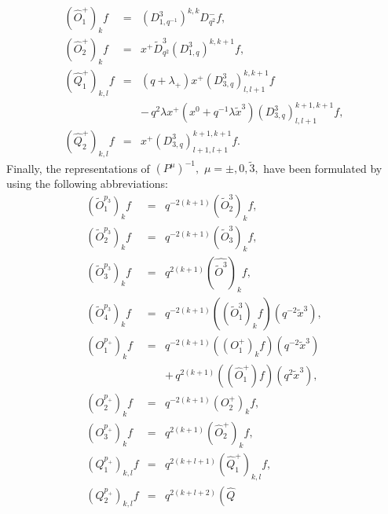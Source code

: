 \documentclass[a4paper,11pt,oneside]{article}
\begin{document}
\begin{enumerate}
\begin{eqnarray}
\\[0.16in]
\left( \hat{O}_{1}^{+}\right) _{k}f &=&\left( D_{1,q^{-1}}^{3}\right)
^{k,k}D_{q^{2}}^{-}f, \\
\left( \hat{O}_{2}^{+}\right) _{k}f &=&x^{+}\tilde{D}_{q^{2}}^{3}\left(
D_{1,q}^{3}\right) ^{k,k+1}f,  \nonumber \\[0.16in]
\left( \hat{Q}_{1}^{+}\right) _{k,l}f &=&\left( q+\lambda _{+}\right)
x^{+}\left( D_{3,q}^{3}\right) _{l,l+1}^{k,k+1}f \\
&&-\,q^{2}\lambda x^{+}\left( x^{0}+q^{-1}\lambda \tilde{x}^{3}\right)
\left( D_{3,q}^{3}\right) _{l,l+1}^{k+1,k+1}f,  \nonumber \\
\left( \hat{Q}_{2}^{+}\right) _{k,l}f &=&x^{+}\left( D_{3,q}^{3}\right)
_{l+1,l+1}^{k+1,k+1}f.  \nonumber
\end{eqnarray}
Finally, the representations of $\left( P^{\mu}\right) ^{-1},$ $\mu=\pm ,0,\tilde{3%
},$ have been formulated by using the following abbreviations: 
\begin{eqnarray}
\left( \tilde{O}_{1}^{p_{3}}\right) _{k}f &=&q^{-2\left( k+1\right) }\left( 
\tilde{O}_{2}^{3}\right) _{k}f, \\
\left( \tilde{O}_{2}^{p_{3}}\right) _{k}f &=&q^{-2\left( k+1\right) }\left( 
\tilde{O}_{3}^{3}\right) _{k}f,  \nonumber \\
\left( \tilde{O}_{3}^{p_{3}}\right) _{k}f &=&q^{2\left( k+1\right) }\left( 
\hat{\tilde{O}^{3}}\right) _{k}f,  \nonumber \\
\left( \tilde{O}_{4}^{p_{3}}\right) _{k}f &=&q^{-2\left( k+1\right) }\left(
\left( \tilde{O}_{1}^{3}\right) _{k}f\right) \left( q^{-2}\tilde{x}%
^{3}\right) ,  \nonumber \\[0.16in]
\left( O_{1}^{p_{+}}\right) _{k}f &=&q^{-2\left( k+1\right) }\left( \left(
O_{1}^{+}\right) _{k}f\right) \left( q^{-2}\tilde{x}^{3}\right) \\
&&+\,q^{2\left( k+1\right) }\left( \left( \hat{O}_{1}^{+}\right) f\right)
\left( q^{2}\tilde{x}^{3}\right) ,  \nonumber \\
\left( O_{2}^{p_{+}}\right) _{k}f &=&q^{-2\left( k+1\right) }\left(
O_{2}^{+}\right) _{k}f,  \nonumber \\
\left( O_{3}^{p_{+}}\right) _{k}f &=&q^{2\left( k+1\right) }\left( \hat{O}%
_{2}^{+}\right) _{k}f,  \nonumber \\[0.16in]
\left( Q_{1}^{p_{+}}\right) _{k,l}f &=&q^{2\left( k+l+1\right) }\left( \hat{Q%
}_{1}^{+}\right) _{k,l}f, \\
\left( Q_{2}^{p_{+}}\right) _{k,l}f &=&q^{2\left( k+l+2\right) }\left( \hat{Q%
}
\end{eqnarray}
\end{enumerate}
\end{document}
